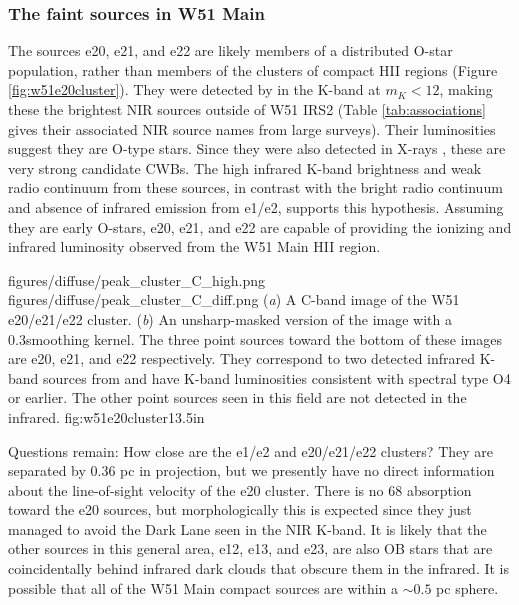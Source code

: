 \subsubsection{The faint sources in W51 Main}

The sources e20, e21, and e22 are likely members of a distributed O-star
population, rather than members of the clusters of compact HII regions (Figure
\ref{fig:w51e20cluster}).  They were detected by \citet{Goldader1994a} in the
K-band at $m_K < 12$, making these the brightest NIR sources outside of W51
IRS2 (Table \ref{tab:associations} gives their associated NIR source names
from large surveys).  Their luminosities suggest they are O-type stars.  Since
they were also detected in X-rays \citep{Townsley2014a}, these are very strong
candidate CWBs.  The high infrared K-band brightness and weak radio
continuum from these sources, in contrast with the bright radio continuum and
absence of infrared emission from e1/e2, supports this hypothesis.  
Assuming they are early O-stars, e20, e21, and e22 are capable of providing the
ionizing and infrared luminosity observed from the W51 Main HII region.

\FigureTwo
{figures/diffuse/peak_cluster_C_high.png}
{figures/diffuse/peak_cluster_C_diff.png}
{({\it a}) A C-band image of the W51 e20/e21/e22 cluster.
({\it b}) An unsharp-masked version of the image with a 0.3\arcsec smoothing
kernel. 
The three point sources toward the bottom of these images are e20, e21, and e22
respectively.  They correspond to two detected infrared K-band sources from
\citet{Goldader1994a} and have K-band luminosities consistent with spectral
type O4 or earlier.  The other point sources seen in this field are not detected
in the infrared.
}
{fig:w51e20cluster}{1}{3.5in}


Questions remain: %
How close are the e1/e2 and e20/e21/e22 clusters?  They are
separated by 0.36 pc in projection, but we presently have no direct information
about the line-of-sight velocity of the e20 cluster.  There is no 68 \kms
\formaldehyde absorption toward the e20 sources, but morphologically this is
expected since they just managed to avoid the Dark Lane seen in the NIR K-band.  It is
likely that the other sources in this general area, e12, e13, and e23, are also
OB stars that are coincidentally behind infrared dark clouds that obscure them
in the infrared.  It is possible that all of the W51 Main compact sources are
within a $\sim 0.5$ pc sphere.

